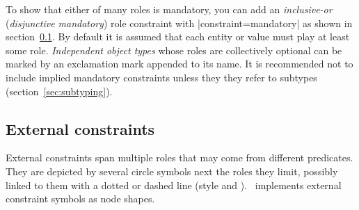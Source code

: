 \documentclass[a4paper,10pt]{article}
\begin{document}
\noindent To show that either of many roles is mandatory, you can add an \emph{inclusive-or} (\emph{disjunctive mandatory}) role constraint with |constraint=mandatory| as shown in section~\ref{sec:externalconstraints}. By default it is assumed that each entity or value must play at least some role. \emph{Independent object types} whose roles are collectively optional can be marked by an exclamation mark appended to its name. It is recommended not to include implied mandatory constraints unless they they refer to subtypes (section~\ref{sec:subtyping}).


\subsection{External constraints}
\label{sec:externalconstraints}
External constraints span multiple roles that may come from different predicates. They are depicted by several circle symbols next the roles they limit, possibly linked to them with a dotted or dashed line (style  and ). \tkzorm\ implements external constraint symbols as node shapes.
\end{document}
